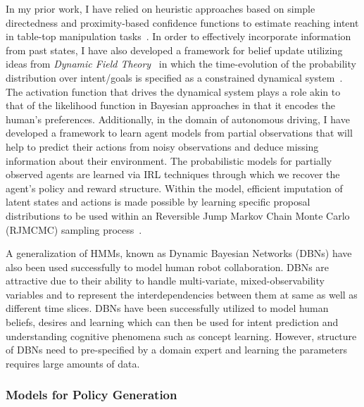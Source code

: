 \documentclass[12pt]{article}
\begin{document}
In my prior work, I have relied on heuristic approaches based on simple directedness and proximity-based confidence functions to estimate reaching intent in table-top manipulation tasks~\cite{gopinath2017human}. In order to effectively incorporate information from past states, I have also developed a framework for belief update utilizing ideas from \textit{Dynamic Field Theory}~\cite{schoner1995dynamics} in which the time-evolution of the probability distribution over intent/goals is specified as a constrained dynamical system~\cite{gopinathdynamic}. The activation function that drives the dynamical system plays a role akin to that of the likelihood function in Bayesian approaches in that it encodes the human's preferences. Additionally, in the domain of autonomous driving, I have developed a framework to learn agent models from partial observations that will help to predict their actions from noisy observations and deduce missing information about their environment. The probabilistic models for partially observed agents are learned via IRL techniques through which we recover the agent's policy and reward structure. Within the model, efficient imputation of latent states and actions is made possible by learning specific proposal distributions\cite{gu2015neural} to be used within an Reversible Jump Markov Chain Monte Carlo (RJMCMC) sampling process~\cite{green1995reversible}. 

A generalization of HMMs, known as Dynamic Bayesian Networks (DBNs) have also been used successfully to model human robot collaboration. DBNs are attractive due to their ability to handle multi-variate, mixed-observability variables and to represent the interdependencies between them at same as well as different time slices\cite{murphy2002dynamic}. DBNs have been successfully utilized to model human beliefs, desires and learning which can then be used for intent prediction and understanding cognitive phenomena such as concept learning\cite{tahboub2006intelligent}. However, structure of DBNs need to pre-specified by a domain expert and learning the parameters requires large amounts of data. 

\subsubsection{Models for Policy Generation}
\end{document}
